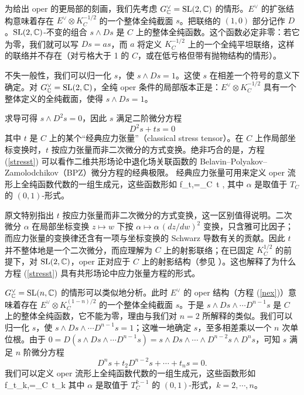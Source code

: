 为给出 oper 的更局部的刻画，我们先考虑 $G^\vee_{\mathbb C}={\mathrm{SL}}(2,{\mathbb C})$ 的情形。$E^\vee$ 的扩张结构意味着存在 $E^\vee \otimes K_C^{-1/2}$ 的一个整体全纯截面 $s$。把联络的 $(1,0)$ 部分记作 $D$。${\mathrm{SL}}(2,{\mathbb C})$-不变的组合 $s \wedge D s$ 是 $C$ 上的整体全纯函数。这个函数必定非零：若它为零，我们就可以写 $D s= a s$，而 $a$ 将定义 $K_C^{-1/2}$ 上的一个全纯平坦联络，这样的联络并不存在（对亏格大于 1 的 $C$，或在低亏格但带有抛物结构的情形）。

不失一般性，我们可以归一化 $s$，使 $s \wedge D s=1$。这使 $s$ 在相差一个符号的意义下确定。对 $G^\vee_{\mathbb C}={\mathrm{SL}}(2,{\mathbb C})$，全纯 oper 条件的局部版本正是：$E^\vee \otimes K_C^{-1/2}$ 具有一个整体定义的全纯截面，使得 $s \wedge D s=1$。

求导可得 $s \wedge D^2 s =0$，因此 $s$ 满足二阶微分方程
\begin{equation}\label{stresst}
D^2 s + t s=0
\end{equation}
其中 $t$ 是 $C$ 上的某个“经典应力张量”（classical stress tensor）。在 $C$ 上作局部坐标变换时，$t$ 按应力张量而非二次微分的方式变换。绝非巧合的是，方程 (\ref{stresst}) 可以看作二维共形场论中退化场关联函数的 Belavin–Polyakov–Zamolodchikov（BPZ）微分方程的经典极限。 经典应力张量可用来定义 oper 流形上全纯函数代数的一组生成元，这些函数形如
\be\label{opjuno2} f_{t,\alpha}=\int_C \alpha \,t ,\ee
其中 $\alpha$ 是取值于 $T_C$ 的 $(0,1)$-形式。

\begin{yizhu}
原文特别指出 $t$ 按应力张量而非二次微分的方式变换，这一区别值得说明。二次微分 $\alpha$ 在局部坐标变换 $z\mapsto w$ 下按 $\alpha\mapsto \alpha\,(dz/dw)^2$ 变换，只含雅可比因子；而应力张量的变换律还含有一项与坐标变换的 Schwarz 导数有关的贡献。因此 $t$ 并不整体地是一个二次微分，而应理解为 $C$ 上的射影联络；在已固定 $K_C^{1/2}$ 的前提下，对 ${\mathrm{SL}}(2,{\mathbb C})$，oper 正对应于 $C$ 上的射影结构（参见 \cite{BD}）。这也解释了为什么方程 (\ref{stresst}) 具有共形场论中应力张量方程的形式。
\end{yizhu}

$G^\vee_{\mathbb C}={\mathrm{SL}}(n,{\mathbb C})$ 的情形可以类似地分析。此时 $E^\vee$ 的 oper 结构（方程 (\ref{nex})）意味着存在 $E^\vee \otimes K_C^{(1-n)/2}$ 的一个整体全纯截面 $s$。于是 $s \wedge D s \wedge \cdots D^{n-1} s$ 是 $C$ 上的整体全纯函数，它不能为零，理由与我们对 $n=2$ 所解释的类似。我们可以归一化 $s$，使 $s \wedge D s \wedge \cdots D^{n-1} s=1$；这唯一地确定 $s$，至多相差乘以一个 $n$ 次单位根。由于 $0=D(s \wedge D s \wedge \cdots D^{n-1} s)=s\wedge Ds \wedge \cdots \wedge  D^{n-2}s\wedge D^ns$，可知 $s$ 满足 $n$ 阶微分方程
\begin{equation}
D^n s + t_2 D^{n-2} s+  \cdots + t_n s =0.
\end{equation}
我们可以定义 oper 流形上全纯函数代数的一组生成元，这些函数形如
\be\label{opjunon} f_{t_k,\alpha}=\int_C \alpha \,t_k \ee
其中 $\alpha$ 是取值于 $T_C^{k-1}$ 的 $(0,1)$-形式，$k=2,\cdots,n$。

